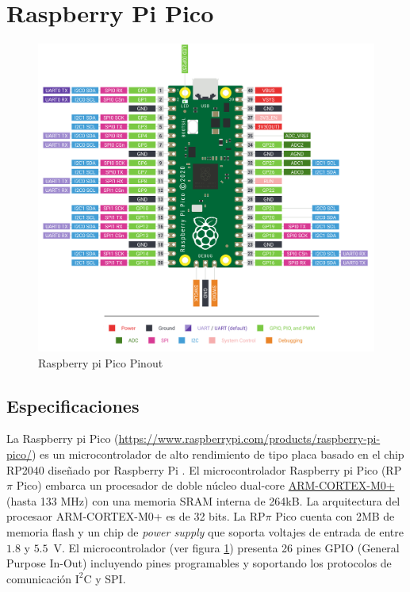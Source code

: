 \documentclass[a4paper,12pt]{book}
\begin{document}
\section{Raspberry Pi Pico}

\begin{figure}[!h]
    \centering
	\includegraphics[width=0.8\linewidth]{raspberry_pi_Pico-R3-Pinout-narrow.png}
 	\caption{Raspberry pi Pico Pinout}
 	\label{fig:raspberry_pinout}
\end{figure}

\subsection{Especificaciones}

La Raspberry pi Pico (\url{https://www.raspberrypi.com/products/raspberry-pi-pico/}) es un microcontrolador de alto rendimiento de tipo placa basado en el chip RP2040 diseñado por Raspberry Pi \cite{raspberrypiPico-datasheet}. El microcontrolador Raspberry pi Pico (RP$\pi$ Pico) embarca un procesador de doble núcleo dual-core \href{https://developer.arm.com/Processors/Cortex-M0-Plus}{ARM-CORTEX-M0+} (hasta 133 MHz) con una memoria SRAM interna de  264kB. La arquitectura del procesaor ARM-CORTEX-M0+ es de 32 bits. La RP$\pi$ Pico cuenta con 2MB de memoria flash y un chip de \emph{power supply} que soporta voltajes de entrada de entre $1.8$ y $5.5$~V. El microcontrolador (ver figura \ref{fig:raspberry_pinout}) presenta 26 pines GPIO (General Purpose In-Out) incluyendo pines programables y soportando los protocolos de comunicación $\mathrm{I^2C}$ y SPI.


\end{document}
